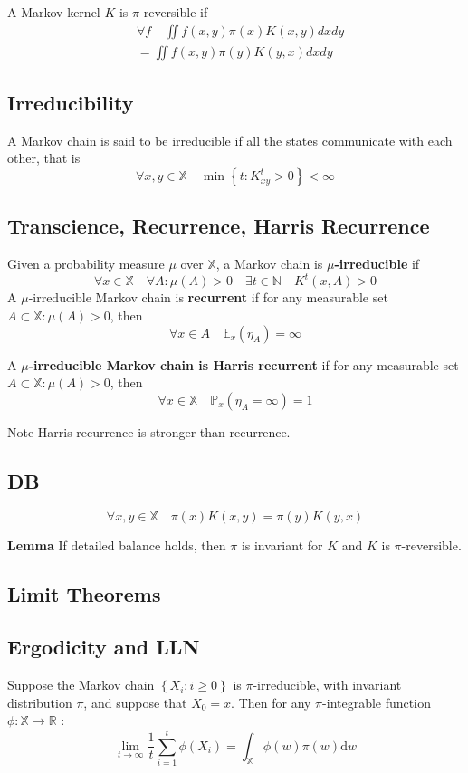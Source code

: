 \documentclass{article}
\begin{document}
A Markov kernel $K$ is $\pi$-reversible if
$$
\begin{aligned}
& \forall f \quad \iint f(x, y) \pi(x) K(x, y) d x d y \\
&= \iint f(x, y) \pi(y) K(y, x) d x d y
\end{aligned}
$$

\subsection{Irreducibility}
A Markov chain is said to be irreducible if all the states communicate with each other, that is
$$
\forall x, y \in \mathbb{X} \quad \min \left\{t: K_{x y}^t>0\right\}<\infty
$$

\subsection{Transcience, Recurrence, Harris Recurrence}
Given a probability measure $\mu$ over $\mathbb{X}$, a Markov chain is \textbf{$\mu$-irreducible }if
$$
\forall x \in \mathbb{X} \quad \forall A: \mu(A)>0 \quad \exists t \in \mathbb{N} \quad K^t(x, A)>0
$$
A $\mu$-irreducible Markov chain is \textbf{recurrent} if for any measurable set $A \subset \mathbb{X}: \mu(A)>0$, then
$$
\forall x \in A \quad \mathbb{E}_x\left(\eta_A\right)=\infty
$$

A\textbf{ $\mu$-irreducible Markov chain is Harris recurrent} if for any measurable set $A \subset \mathbb{X}: \mu(A)>0$, then
$$
\forall x \in \mathbb{X} \quad \mathbb{P}_x\left(\eta_A=\infty\right)=1
$$

Note Harris recurrence is stronger than recurrence.

\subsection{DB}

$$
\forall x, y \in \mathbb{X} \quad \pi(x) K(x, y)=\pi(y) K(y, x)
$$

\textbf{Lemma}
If detailed balance holds, then $\pi$ is invariant for $K$ and $K$ is $\pi$-reversible.

\subsection{Limit Theorems}
\subsection{Ergodicity and LLN}
Suppose the Markov chain $\left\{X_i ; i \geq 0\right\}$ is $\pi$-irreducible, with invariant distribution $\pi$, and suppose that $X_0=x$.
Then for any $\pi$-integrable function $\phi: \mathbb{X} \rightarrow \mathbb{R}$ :
$$
\lim _{t \rightarrow \infty} \frac{1}{t} \sum_{i=1}^t \phi\left(X_i\right)=\int_{\mathbb{X}} \phi(w) \pi(w) \mathrm{d} w
$$
\end{document}
